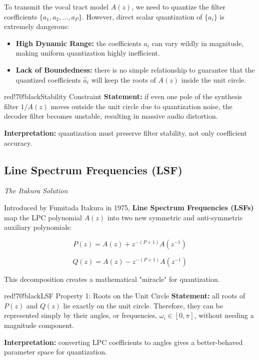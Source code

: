To transmit the vocal tract model $A(z)$, we need to quantize the filter coefficients $\{a_1, a_2, \ldots, a_P\}$. However, direct scalar quantization of $\{a_i\}$ is extremely dangerous:

\begin{itemize}
\item \textbf{High Dynamic Range:} the coefficients $a_i$ can vary wildly in magnitude, making uniform quantization highly inefficient.
\item \textbf{Lack of Boundedness:} there is no simple relationship to guarantee that the quantized coefficients $\hat{a}_i$ will keep the roots of $A(z)$ inside the unit circle.
\end{itemize}

\begin{calloutbox}{red!70!black}{Stability Constraint}
\textbf{Statement:} if even one pole of the synthesis filter $1/A(z)$ moves outside the unit circle due to quantization noise, the decoder filter becomes unstable, resulting in massive audio distortion.

\textbf{Interpretation:} quantization must preserve filter stability, not only coefficient accuracy.
\end{calloutbox}

\subsection{Line Spectrum Frequencies (LSF)}

\textit{The Itakura Solution}

Introduced by Fumitada Itakura in 1975, \textbf{Line Spectrum Frequencies (LSFs)} map the LPC polynomial $A(z)$ into two new symmetric and anti-symmetric auxiliary polynomials:

\[
P(z) = A(z) + z^{-(P+1)}A(z^{-1})
\]

\[
Q(z) = A(z) - z^{-(P+1)}A(z^{-1})
\]

This decomposition creates a mathematical "miracle" for quantization.

\begin{calloutbox}{red!70!black}{LSF Property 1: Roots on the Unit Circle}
\textbf{Statement:} all roots of $P(z)$ and $Q(z)$ lie exactly on the unit circle. Therefore, they can be represented simply by their angles, or frequencies, $\omega_i \in [0, \pi]$, without needing a magnitude component.

\textbf{Interpretation:} converting LPC coefficients to angles gives a better-behaved parameter space for quantization.
\end{calloutbox}

